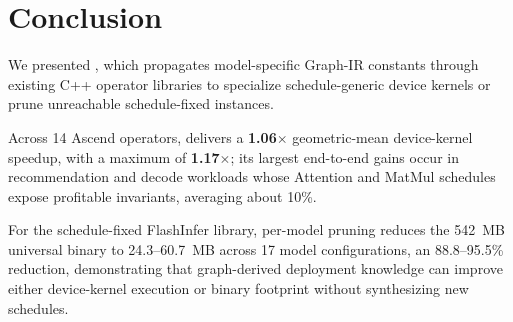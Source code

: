 \section{Conclusion}
\label{sec:concl}

We presented \mysys, which propagates model-specific Graph-IR constants through
existing C++ operator libraries to specialize schedule-generic device kernels
or prune unreachable schedule-fixed instances.

Across 14 Ascend operators, \mysys delivers a \textbf{1.06$\times$}
geometric-mean device-kernel speedup, with a maximum of
\textbf{1.17$\times$}; its largest end-to-end gains occur in recommendation and
decode workloads whose Attention and MatMul schedules expose profitable
invariants, averaging about 10\%.

For the schedule-fixed FlashInfer library, per-model pruning reduces the
542~MB universal binary to 24.3--60.7~MB across 17 model configurations,
an 88.8--95.5\% reduction, demonstrating that graph-derived deployment
knowledge can improve either device-kernel execution or binary footprint
without synthesizing new schedules.
